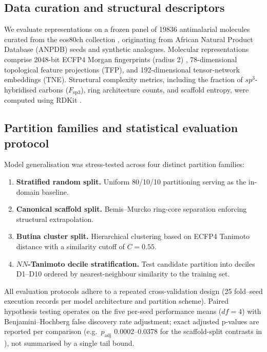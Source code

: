 \documentclass[11pt,a4paper]{article}
\begin{document}
\subsection{Data curation and structural descriptors}

We evaluate representations on a frozen panel of \num{19836} antimalarial molecules curated from the eos80ch collection \citep{temgoua2026antimalarial}, originating from African Natural Product Database (ANPDB) seeds and synthetic analogues. Molecular representations comprise \num{2048}-bit ECFP4 Morgan fingerprints (radius 2) \citep{ecfp_2010}, \num{78}-dimensional topological feature projections (TFP), and \num{192}-dimensional tensor-network embeddings (TNE). Structural complexity metrics, including the fraction of $sp^3$-hybridised carbons ($F_{\mathrm{sp3}}$), ring architecture counts, and scaffold entropy, were computed using RDKit \citep{RDKit}.

\subsection{Partition families and statistical evaluation protocol}

Model generalisation was stress-tested across four distinct partition families:
\begin{enumerate}[leftmargin=*]
    \item \textbf{Stratified random split.} Uniform \num{80}/\num{10}/\num{10} partitioning serving as the in-domain baseline.
    \item \textbf{Canonical scaffold split.} Bemis--Murcko ring-core separation \citep{bemis_murcko_1996} enforcing structural extrapolation.
    \item \textbf{Butina cluster split.} Hierarchical clustering based on ECFP4 Tanimoto distance with a similarity cutoff of $C=\num{0.55}$.
    \item \textbf{$NN$-Tanimoto decile stratification.} Test candidate partition into deciles D1--D10 ordered by nearest-neighbour similarity to the training set.
\end{enumerate}
All evaluation protocols adhere to a repeated  cross-validation design (\num{25} fold--seed execution records per model architecture and partition scheme). Paired hypothesis testing operates on the five per-seed performance means ($df=\num{4}$) with Benjamini--Hochberg false discovery rate adjustment; exact adjusted p-values are reported per comparison (e.g.\ $p_{\text{adj}}$ \numrange{0.0002}{0.0378} for the scaffold-split contrasts in ), not summarised by a single tail bound.
\end{document}
